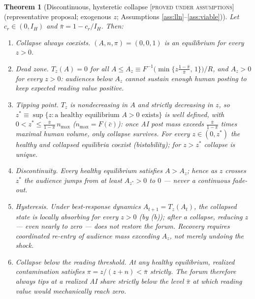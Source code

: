 \documentclass[11pt]{article}
\newtheorem{theorem}{Theorem}
\theoremstyle{remark}
\newcommand{\statusPA}{\textsc{[proved under assumptions]}}
\begin{document}
\begin{theorem}[Discontinuous, hysteretic collapse \statusPA{} (representative proposal; exogenous $z$; Assumptions \ref{ass:lln}--\ref{ass:viable})]
\label{thm:tipping}
Let $c_r\in(0,I_H)$ and $\bar\pi=1-c_r/I_H$. Then:
\begin{enumerate}[label=(\alph*),itemsep=1pt]
\item \emph{Collapse always coexists.} $(A,n,\pi)=(0,0,1)$ is an equilibrium for
every $z>0$.
\item \emph{Dead zone.} $T_z(A)=0$ for all $A\le A_z\equiv F^{-1}\bigl(\min\{z\tfrac{1-\bar\pi}{\bar\pi},\,1\}\bigr)/R$,
and $A_z>0$ for every $z>0$: audiences below $A_z$ cannot sustain enough human
posting to keep expected reading value positive.
\item \emph{Tipping point.} $T_z$ is nondecreasing in $A$ and strictly
decreasing in $z$, so
$z^*\equiv\sup\{z:\text{a healthy equilibrium }A>0\text{ exists}\}$
is well defined, with $0<z^*\le\frac{\bar\pi}{1-\bar\pi}\,n_{\max}$
($n_{\max}=F(\bar c)$): once AI post mass exceeds $\frac{\bar\pi}{1-\bar\pi}$
times maximal human volume, only collapse survives. For every $z\in(0,z^*)$ the
healthy and collapsed equilibria \emph{coexist} (bistability); for $z>z^*$
collapse is unique.
\item \emph{Discontinuity.} Every healthy equilibrium satisfies $A>A_z$; hence
as $z$ crosses $z^*$ the audience jumps from at least $A_{z^*}>0$ to $0$ ---
never a continuous fade-out.
\item \emph{Hysteresis.} Under best-response dynamics $A_{t+1}=T_z(A_t)$, the
collapsed state is locally absorbing for every $z>0$ (by (b)); after a collapse,
reducing $z$ --- even nearly to zero --- does not restore the forum. Recovery
requires coordinated re-entry of audience mass exceeding $A_z$, not merely
undoing the shock.
\item \emph{Collapse below the reading threshold.} At any healthy equilibrium,
realized contamination satisfies $\pi=z/(z+n)<\bar\pi$ strictly. The forum
therefore always tips at a realized AI share strictly below the level
$\bar\pi$ at which reading value would mechanically reach zero.
\end{enumerate}
\end{theorem}
\end{document}
